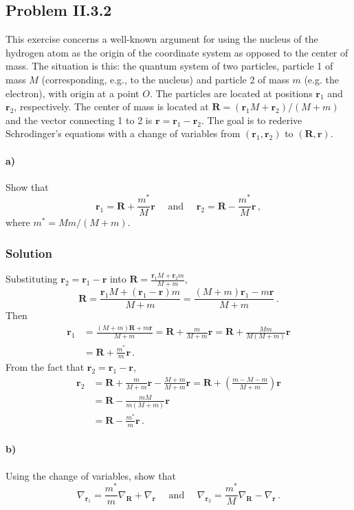 \documentclass[letterpaper,10pt]{article}
\def\mbf{\mathbf}
\def\R{\mathbf{R}}
\def\r{\mathbf{r}}
\begin{document}
\subsection*{Problem II.3.2}
This exercise concerns a well-known argument for using the nucleus of the
hydrogen atom as the origin of the coordinate system as opposed to the center
of mass. The situation is this: the quantum system of two particles, particle 1
of mass $M$ (corresponding, e.g., to the nucleus) and particle 2 of mass $m$
(e.g. the electron), with origin at a point $O$. The particles are located at
positions $\mbf{r}_1$ and $\mbf{r}_2$, respectively. The center of mass is
located at $\mbf{R}=(\mbf{r}_1M+\mbf{r}_2)/(M+m)$ and the vector connecting 1
to 2 is $\mbf{r}=\mbf{r}_1-\mbf{r}_2$. The goal is to rederive Schrodinger's
equations with a change of variables from $(\mbf{r}_1,\mbf{r}_2)$ to
$(\mbf{R},\mbf{r})$.

\paragraph*{a)} Show that
\[
\mbf{r}_1=\mbf{R}+\frac{m^*}{M}\mbf{r}\quad\text{ and }\quad
\mbf{r}_2=\mbf{R}-\frac{m^*}{M}\mbf{r}\,,
\]
where $m^*=Mm/(M+m)$.
\subsubsection*{Solution}
Substituting $\r_2=\r_1-\r$ into $\R=\frac{\r_1M+\r_2m}{M+m}$,
\[
\R=\frac{\r_1M+(\r_1-\r)m}{M+m}=\frac{(M+m)\r_1-m\r}{M+m}\,.
\]
Then
\begin{align*}
\r_1&=\frac{(M+m)\R+m\r}{M+m}=\R+\frac{m}{M+m}\r=\R+\frac{Mm}{M(M+m)}\r\\
&=\R+\frac{m^*}{m}\r\,.
\end{align*}
From the fact that $\r_2=\r_1-\r$,
\begin{align*}
\r_2&=\R+\frac{m}{M+m}\r-\frac{M+m}{M+m}\r
=\R+\left(\frac{m-M-m}{M+m}\right)\r\\&=\R-\frac{mM}{m(M+m)}\r\\
&=\R-\frac{m^*}{m}\r\,.
\end{align*}
\paragraph*{b)}Using the change of variables, show that
\[
\nabla_{\r_1}=\frac{m^*}{m}\nabla_\R+\nabla_\r \quad\text{ and }\quad
\nabla_{\r_2}=\frac{m^*}{M}\nabla_\R-\nabla_\r\,.
\]
\end{document}

